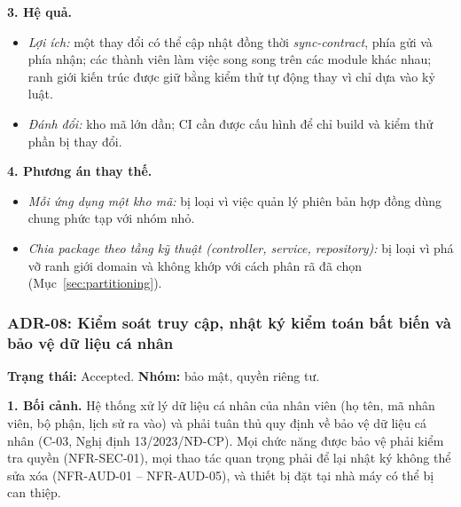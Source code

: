 \noindent\textbf{3. Hệ quả.}
\begin{itemize}
    \item \textit{Lợi ích:} một thay đổi có thể cập nhật đồng thời \textit{sync-contract}, phía gửi và phía nhận; các thành viên làm việc song song trên các module khác nhau; ranh giới kiến trúc được giữ bằng kiểm thử tự động thay vì chỉ dựa vào kỷ luật.
    \item \textit{Đánh đổi:} kho mã lớn dần; CI cần được cấu hình để chỉ build và kiểm thử phần bị thay đổi.
\end{itemize}

\noindent\textbf{4. Phương án thay thế.}
\begin{itemize}
    \item \textit{Mỗi ứng dụng một kho mã:} bị loại vì việc quản lý phiên bản hợp đồng dùng chung phức tạp với nhóm nhỏ.
    \item \textit{Chia package theo tầng kỹ thuật (controller, service, repository):} bị loại vì phá vỡ ranh giới domain và không khớp với cách phân rã đã chọn (Mục~\ref{sec:partitioning}).
\end{itemize}

\subsubsection{ADR-08: Kiểm soát truy cập, nhật ký kiểm toán bất biến và bảo vệ dữ liệu cá nhân}\label{adr:08}
\textbf{Trạng thái:} Accepted. \textbf{Nhóm:} bảo mật, quyền riêng tư.

\noindent\textbf{1. Bối cảnh.} Hệ thống xử lý dữ liệu cá nhân của nhân viên (họ tên, mã nhân viên, bộ phận, lịch sử ra vào) và phải tuân thủ quy định về bảo vệ dữ liệu cá nhân (C-03, Nghị định 13/2023/NĐ-CP). Mọi chức năng được bảo vệ phải kiểm tra quyền (NFR-SEC-01), mọi thao tác quan trọng phải để lại nhật ký không thể sửa xóa (NFR-AUD-01 -- NFR-AUD-05), và thiết bị đặt tại nhà máy có thể bị can thiệp.

